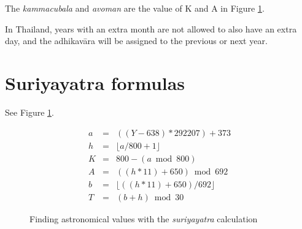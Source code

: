 \documentclass[11pt,oneside]{memoir-article}
\begin{document}
The \emph{kammacubala} and \emph{avoman} are the value of K and A in Figure
\ref{fig-suriyayatra}.

In Thailand, years with an extra month are not allowed to also have an
extra day, and the adhikavāra will be assigned to the previous or next
year.
\section{Suriyayatra formulas}
\label{sec-3-5}

See Figure \ref{fig-suriyayatra}.

\begin{figure}
\caption{\label{fig-suriyayatra}Finding astronomical values with the \emph{suriyayatra} calculation\cite{eade-interpolation}}
\begin{eqnarray}
a & = & ((Y - 638) * 292207) + 373 \\
h & = & \lfloor a/800 + 1 \rfloor \\
K & = & 800 - (a \bmod 800) \\
A & = & ((h*11) + 650) \bmod 692 \\
b & = & \lfloor ((h*11) + 650) / 692 \rfloor \\
T & = & (b + h) \bmod 30
\end{eqnarray}
\end{figure}
\end{document}
